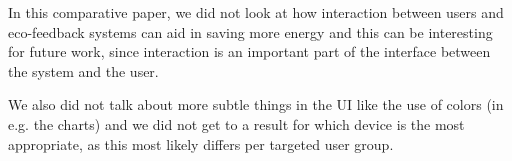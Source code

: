 \documentclass[journal]{vgtc}                %
\begin{document}
In this comparative paper, we did not look at how interaction between users and eco-feedback systems can aid in saving more energy and this can be interesting for future work, since interaction is an important part of the interface between the system and the user.

We also did not talk about more subtle things in the UI like the use of colors (in e.g. the charts) and we did not get to a result for which device is the most appropriate, as this most likely differs per targeted user group.




\end{document}
